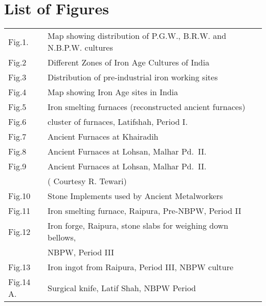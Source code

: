 \chapter*{\centering List of Figures}\label{figures}


\vspace{-1cm}

{\fontsize{9}{11}\selectfont\begin{longtable}{@{}p{1.3cm}@{}p{8cm}@{}}
Fig.1. & Map showing distribution of P.G.W., B.R.W. and N.B.P.W. cultures\\[2pt]

Fig.2 & Different Zones of Iron Age Cultures of India \\[2pt]

Fig.3  & Distribution of pre-industrial iron working sites\\[2pt]

Fig.4  & Map showing Iron Age sites in India\\[2pt]

Fig.5  & Iron smelting furnaces (reconstructed ancient furnaces)\\[2pt]

Fig.6  & cluster of furnaces,  Latifshah, Period I.\\[2pt]

Fig.7  & Ancient Furnaces at Khairadih \\[2pt] 

Fig.8  & Ancient Furnaces at Lohsan, Malhar Pd.~II.\\[2pt]

Fig.9  & Ancient Furnaces at Lohsan, Malhar Pd.~II.\\[2pt]
       &( Courtesy R. Tewari)\\[2pt]

Fig.10  & Stone Implements used by Ancient Metalworkers\\[2pt]

Fig.11  & Iron smelting furnace, Raipura, Pre-NBPW, Period II\\[2pt]

Fig.12  & Iron forge, Raipura, stone slabs for weighing down bellows,\\[2pt]
        &  NBPW, Period III \\[2pt]
Fig.13  & Iron ingot from Raipura, Period III, NBPW culture \\[2pt]

Fig.14 A.  & Surgical knife, Latif Shah, NBPW Period\\[2pt]


\end{longtable}}
